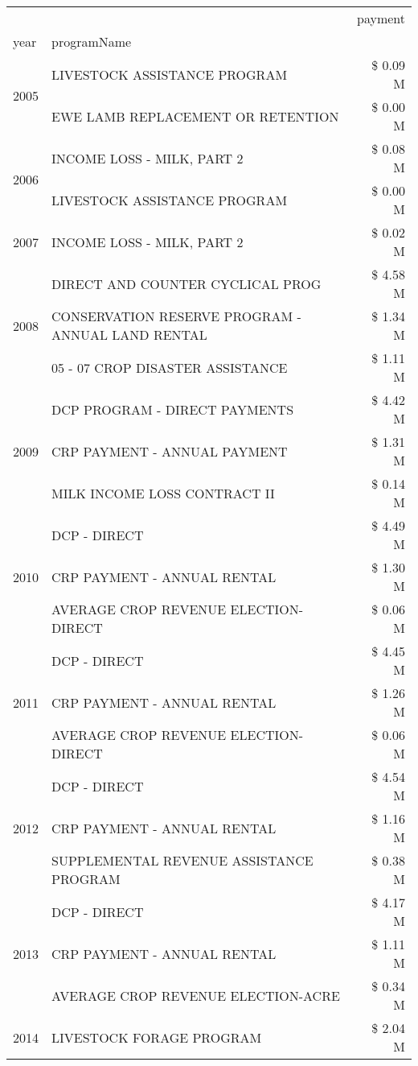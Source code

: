 \begin{tabular}{llr}
\toprule
 &  & payment \\
year & programName &  \\
\midrule
\multirow[t]{2}{*}{2005} & LIVESTOCK ASSISTANCE PROGRAM & \$ 0.09 M \\
 & EWE LAMB REPLACEMENT OR RETENTION & \$ 0.00 M \\
\cline{1-3}
\multirow[t]{2}{*}{2006} & INCOME LOSS - MILK, PART 2 & \$ 0.08 M \\
 & LIVESTOCK ASSISTANCE PROGRAM & \$ 0.00 M \\
\cline{1-3}
2007 & INCOME LOSS - MILK, PART 2 & \$ 0.02 M \\
\cline{1-3}
\multirow[t]{3}{*}{2008} & DIRECT AND COUNTER CYCLICAL PROG & \$ 4.58 M \\
 & CONSERVATION RESERVE PROGRAM - ANNUAL LAND RENTAL & \$ 1.34 M \\
 & 05 - 07 CROP DISASTER ASSISTANCE & \$ 1.11 M \\
\cline{1-3}
\multirow[t]{3}{*}{2009} & DCP PROGRAM - DIRECT PAYMENTS & \$ 4.42 M \\
 & CRP PAYMENT - ANNUAL PAYMENT & \$ 1.31 M \\
 & MILK INCOME LOSS CONTRACT II & \$ 0.14 M \\
\cline{1-3}
\multirow[t]{3}{*}{2010} & DCP - DIRECT & \$ 4.49 M \\
 & CRP PAYMENT - ANNUAL RENTAL & \$ 1.30 M \\
 & AVERAGE CROP REVENUE ELECTION-DIRECT & \$ 0.06 M \\
\cline{1-3}
\multirow[t]{3}{*}{2011} & DCP - DIRECT & \$ 4.45 M \\
 & CRP PAYMENT - ANNUAL RENTAL & \$ 1.26 M \\
 & AVERAGE CROP REVENUE ELECTION-DIRECT & \$ 0.06 M \\
\cline{1-3}
\multirow[t]{3}{*}{2012} & DCP - DIRECT & \$ 4.54 M \\
 & CRP PAYMENT - ANNUAL RENTAL & \$ 1.16 M \\
 & SUPPLEMENTAL REVENUE ASSISTANCE PROGRAM & \$ 0.38 M \\
\cline{1-3}
\multirow[t]{3}{*}{2013} & DCP - DIRECT & \$ 4.17 M \\
 & CRP PAYMENT - ANNUAL RENTAL & \$ 1.11 M \\
 & AVERAGE CROP REVENUE ELECTION-ACRE & \$ 0.34 M \\
\cline{1-3}
\multirow[t]{3}{*}{2014} & LIVESTOCK FORAGE PROGRAM & \$ 2.04 M \\

\end{tabular}
